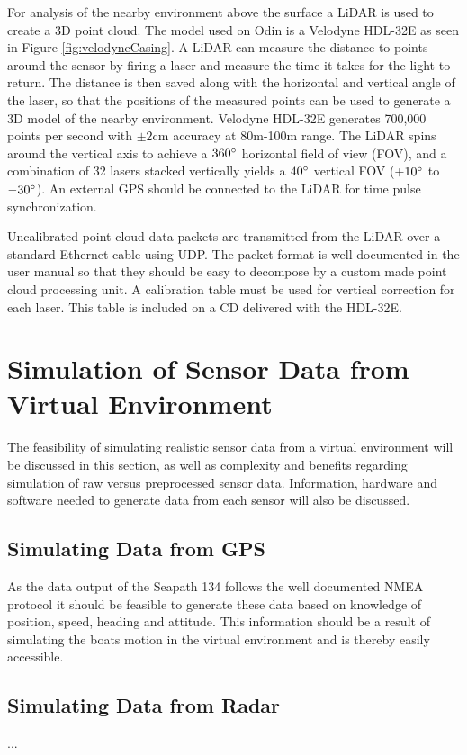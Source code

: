 For analysis of the nearby environment above the surface a LiDAR is used to create a 3D point cloud. The model used on Odin is a Velodyne HDL-32E as seen in Figure \ref{fig:velodyneCasing}. A LiDAR can measure the distance to points around the sensor by firing a laser and measure the time it takes for the light to return. The distance is then saved along with the horizontal and vertical angle of the laser, so that the positions of the measured points can be used to generate a 3D model of the nearby environment. Velodyne HDL-32E generates 700,000 points per second with $\pm2$cm accuracy at 80m-100m range. The LiDAR spins around the vertical axis to achieve a $360\degree$ horizontal field of view (FOV), and a combination of 32 lasers stacked vertically yields a $40\degree$ vertical FOV ($+10\degree$ to $-30\degree$). An external GPS should be connected to the LiDAR for time pulse synchronization.

Uncalibrated point cloud data packets are transmitted from the LiDAR over a standard Ethernet cable using UDP. The packet format is well documented in the user manual so that they should be easy to decompose by a custom made point cloud processing unit. A calibration table must be used for vertical correction for each laser. This table is included on a CD delivered with the HDL-32E.
 


\section{Simulation of Sensor Data from Virtual Environment}
The feasibility of simulating realistic sensor data from a virtual environment will be discussed in this section, as well as complexity and benefits regarding simulation of raw versus preprocessed sensor data. Information, hardware and software needed to generate data from each sensor will also be discussed.

\subsection{Simulating Data from GPS}
As the data output of the Seapath 134 follows the well documented NMEA protocol it should be feasible to generate these data based on knowledge of position, speed, heading and attitude. This information should be a result of simulating the boats motion in the virtual environment and is thereby easily accessible.

\subsection{Simulating Data from Radar}
...

